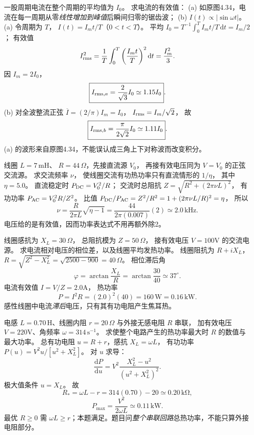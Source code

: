 一股周期电流在整个周期的平均值为 $I_0$。
求电流的有效值：
(a) 如原图4.34，电流在每一周期从零\emph{线性增加到峰值}后瞬间归零的锯齿波；
(b) $I(t)\propto|\sin\omega t|$。
\exsolution
(a) 令周期为 $T$，
$I(t)=I_m t/T$（$0<t<T$）。
平均
$I_0=T^{-1}\int_0^T I_m t/T\,\mathrm dt=I_m/2$；
有效值
\[
I_{\rm rms}^2=\frac1T\int_0^T
\left(\frac{I_mt}{T}\right)^2\mathrm dt
=\frac{I_m^2}{3}.
\]
因 $I_m=2I_0$，
\[
\boxed{I_{{\rm rms},a}=\frac2{\sqrt3}I_0\simeq1.15I_0}.
\]
(b) 对全波整流正弦
$\overline I=(2/\pi)I_m=I_0$，
$I_{\rm rms}=I_m/\sqrt2$，
故
\[
\boxed{I_{{\rm rms},b}=\frac{\pi}{2\sqrt2}I_0
\simeq1.11I_0}.
\]
\excheck (a) 的波形来自原图4.34，不能误认成三角上下对称波而改变积分。

线圈 $L=7\,\mathrm{mH}$、
$R=44\,\Omega$，先接直流源 $V_0$，
再接有效电压同为 $V=V_0$ 的正弦交流源。
求交流频率 $\nu$，
使线圈交流有功热功率只有直流情形的 $1/\eta$，
其中 $\eta=5.0$。
\exsolution
直流稳定时 $P_{\rm DC}=V_0^2/R$；
交流时总阻抗
$Z=\sqrt{R^2+(2\pi\nu L)^2}$，
有功功率
$P_{\rm AC}=V_0^2R/Z^2$。
比值
$P_{\rm DC}/P_{\rm AC}
=Z^2/R^2=1+(2\pi\nu L/R)^2=\eta$，
所以
\[
\boxed{\nu=\frac{R}{2\pi L}\sqrt{\eta-1}
=\frac{44}{2\pi(0.007)}(2)
\simeq2.0\,\mathrm{kHz}}.
\]
\excheck 电压给的是有效值，因而功率表达式不用再额外除2。

线圈感抗为 $X_L=30\,\Omega$，
总阻抗模为 $Z=50\,\Omega$，
接有效电压 $V=100$V 的交流电源。
求电流相对电压的相位差，以及线圈平均发热功率。
\exsolution
线圈阻抗为 $R+iX_L$，
$R=\sqrt{Z^2-X_L^2}
=\sqrt{2500-900}=40\,\Omega$。
相位滞后角
\[
\boxed{\varphi=\arctan\frac{X_L}{R}
=\arctan\frac{30}{40}
\simeq37^\circ}.
\]
电流有效值 $I=V/Z=2.0$A，
热功率
\[
\boxed{P=I^2R=(2.0)^2(40)
=160\,\mathrm W=0.16\,\mathrm{kW}}.
\]
\excheck 感性线圈中电流\emph{滞后}电压，只有其有功电阻产生焦耳热。

电感 $L=0.70\,\mathrm H$、线圈内阻 $r=20\,\Omega$ 与外接无感电阻 $R$ 串联，
加有效电压 $V=220$V、角频率
$\omega=314\,\mathrm{s^{-1}}$。
求使整个电路产生的热功率最大时 $R$ 的数值与最大功率。
\exsolution
总有功电阻
$u=R+r$，感抗 $X_L=\omega L$，
有功功率
$P(u)=V^2u/[u^2+X_L^2]$。
对 $u$ 求导：
\[
\frac{\mathrm dP}{\mathrm du}
=V^2\frac{X_L^2-u^2}{(u^2+X_L^2)^2}.
\]
极大值条件 $u=X_L$。
故
\[
\boxed{R_*=\omega L-r
=314(0.70)-20\simeq0.20\,\mathrm{k\Omega}},
\]
\[
\boxed{P_{\max}=\frac{V^2}{2\omega L}
\simeq0.11\,\mathrm{kW}}.
\]
\excheck 最优 $R\ge0$ 需 $\omega L\ge r$；本题满足。题目问\emph{整个串联回路}总热功率，不能只算外接电阻部分。

